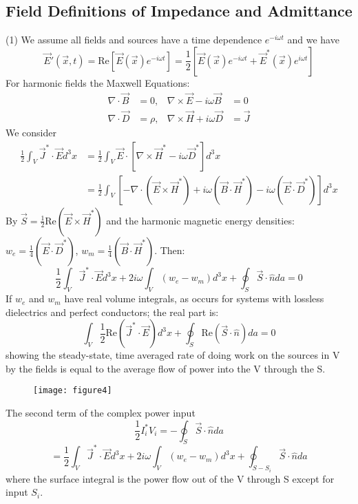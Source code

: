 \documentclass{article}
\begin{document}
	\subsection*{Field Definitions of Impedance and Admittance}
	(1) We assume all fields and sources have a time dependence $e^{-i\omega t}$ and we have
	\[
	\vec{E}'(\vec{x}, t) = \text{Re}[\vec{E}(\vec{x}) e^{-i\omega t}] = \frac{1}{2} [ \vec{E}(\vec{x})e^{-i\omega t} + \vec{E}^*(\vec{x})e^{i\omega t} ]
	\]
	For harmonic fields the Maxwell Equations:
	\begin{align*}
		\nabla \cdot \vec{B} &= 0, & \nabla \times \vec{E} - i\omega \vec{B} &= 0 \\
		\nabla \cdot \vec{D} &= \rho, & \nabla \times \vec{H} + i\omega \vec{D} &= \vec{J}
	\end{align*}
	We consider
	\begin{align*}
		\frac{1}{2} \int_V \vec{J}^* \cdot \vec{E} d^3x &= \frac{1}{2} \int_V \vec{E} \cdot [\nabla \times \vec{H}^* - i\omega\vec{D}^*] d^3x \\
		&= \frac{1}{2} \int_V [ - \nabla \cdot (\vec{E} \times \vec{H}^*) + i\omega(\vec{B} \cdot \vec{H}^*) - i\omega(\vec{E} \cdot \vec{D}^*)] d^3x
	\end{align*}
	By $\vec{S} = \frac{1}{2} \text{Re}(\vec{E} \times \vec{H}^*)$ and the harmonic magnetic energy densities: $w_e = \frac{1}{4}(\vec{E} \cdot \vec{D}^*)$, $w_m = \frac{1}{4}(\vec{B} \cdot \vec{H}^*)$.
	Then:
	\[
	\frac{1}{2} \int_V \vec{J}^* \cdot \vec{E} d^3x + 2i\omega \int_V (w_e - w_m) d^3x + \oint_S \vec{S} \cdot \hat{n} da = 0
	\]
	If $w_e$ and $w_m$ have real volume integrals, as occurs for systems with lossless dielectrics and perfect conductors; the real part is:
	\[
	\int_V \frac{1}{2} \text{Re}(\vec{J}^* \cdot \vec{E}) d^3x + \oint_S \text{Re}(\vec{S} \cdot \hat{n}) da = 0
	\]
	showing the steady-state, time averaged rate of doing work on the sources in V by the fields is equal to the average flow of power into the V through the S. \\
	
	\begin{figure}[h]
		\centering
		\texttt{[image: figure4]}
		\caption{}
		\label{fig:figure4}
	\end{figure}
	
	The second term of the complex power input
	\[
	\frac{1}{2} I_i^* V_i = - \oint_S \vec{S} \cdot \hat{n} da
	\]
	\[
	= \frac{1}{2} \int_V \vec{J}^* \cdot \vec{E} d^3x + 2i\omega \int_V (w_e - w_m) d^3x + \oint_{S-S_i} \vec{S} \cdot \hat{n} da
	\]
	where the surface integral is the power flow out of the V through S except for input $S_i$.
	
\end{document}
